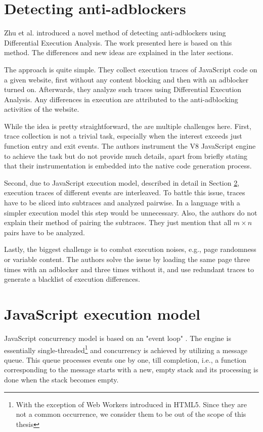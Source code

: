 \section{Detecting anti-adblockers}

Zhu et al. \cite{DBLP:conf/ndss/ZhuHQSY18} introduced a novel method of detecting anti-adblockers
using Differential Execution Analysis. The work presented here is based on this method. 
The differences and new ideas are explained in the later sections.

The approach is quite simple. They collect execution traces of JavaScript code on a given website,
first without any content blocking and then with an adblocker turned on.
Afterwards, they analyze such traces using Differential Execution Analysis. Any differences in execution
are attributed to the anti-adblocking activities of the website.

While the idea is pretty straightforward, the are multiple challenges here. 
First, trace collection is not a trivial task, especially when the interest exceeds just function entry and exit events.
The authors instrument the V8 JavaScript engine \cite{v8:main-page} to achieve the task but do not provide much details, apart from briefly stating that
their instrumentation is embedded into the native code generation process.

Second, due to JavaScript execution model, described in detail in Section \ref{js-exec-model}, execution traces of different
events are interleaved. To battle this issue, traces have to be sliced into subtraces and analyzed pairwise.
In a language with a simpler execution model this step would be unnecessary.
Also, the authors do not explain their method of pairing the subtraces. They just mention that all $m \times n$ pairs 
have to be analyzed.

Lastly, the biggest challenge is to combat execution noises, e.g., page randomness or variable content.
The authors solve the issue by loading the same page three times with an adblocker and three times without it, and
use redundant traces to generate a blacklist of execution differences.


\section{JavaScript execution model}
\label{js-exec-model}

JavaScript concurrency model is based on an "event loop" \cite{mozilla:event-loop}. The engine is essentially single-threaded\footnote{With the exception of Web Workers introduced in HTML5. Since they are not a common occurrence, 
we consider them to be out of the scope of this thesis}
and concurrency is achieved by utilizing a message queue. This queue processes events one by one, 
till completion, i.e., a function corresponding to the message starts with a new, 
empty stack and its processing is done when the stack becomes empty.

